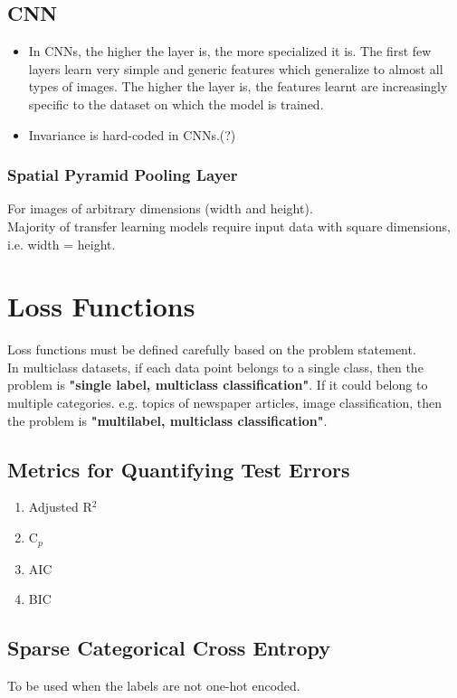 \documentclass[a4paper, 12pt]{report}
\begin{document}
\section{CNN}
\label{sec:cnn}
\begin{itemize}
\item In CNNs, the higher the layer is, the more specialized it is. The first few layers learn very simple and generic features which generalize to almost all types of images. The higher the layer is, the features learnt are increasingly specific to the dataset on which the model is trained.
\item {\color{red}Invariance is hard-coded in CNNs.(?)}
\end{itemize}

\subsection{Spatial Pyramid Pooling Layer}
For images of arbitrary dimensions (width and height).\\
Majority of transfer learning models require input data with square dimensions, i.e. width = height.

\chapter{Loss Functions}
Loss functions must be defined carefully based on the problem statement.\\

In multiclass datasets, if each data point belongs to a single class, then the problem is \textbf{"single label, multiclass classification"}. If it could belong to multiple categories. e.g. topics of newspaper articles, image classification, then the problem is \textbf{"multilabel, multiclass classification"}.


\section{Metrics for Quantifying Test Errors}
\begin{enumerate}
\item Adjusted R${^2}$
\item C${_p}$
\item AIC
\item BIC
\end{enumerate}

\section{Sparse Categorical Cross Entropy}
To be used when the labels are not one-hot encoded.
\end{document}
